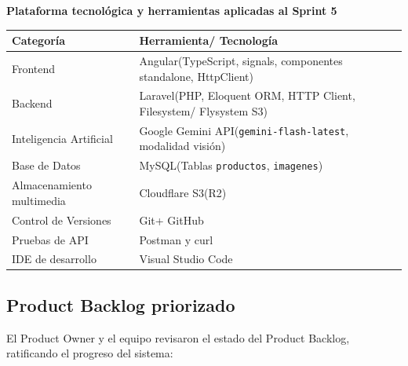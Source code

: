 \documentclass[12pt,a4paper]{article}
\begin{document}
\textbf{Plataforma tecnológica y herramientas aplicadas al Sprint 5}

\begin{center}
\small
\begin{tabularx}{\textwidth}{p{4.8cm} L}
\toprule
\textbf{Categoría} & \textbf{Herramienta/ Tecnología} \\
\midrule
Frontend & Angular(TypeScript, signals, componentes standalone, HttpClient) \\
Backend & Laravel(PHP, Eloquent ORM, HTTP Client, Filesystem/ Flysystem S3) \\
Inteligencia Artificial & Google Gemini API(\texttt{gemini-flash-latest}, modalidad visión) \\
Base de Datos & MySQL(Tablas \texttt{productos}, \texttt{imagenes}) \\
Almacenamiento multimedia & Cloudflare S3(R2) \\
Control de Versiones & Git+ GitHub \\
Pruebas de API & Postman y curl \\
IDE de desarrollo & Visual Studio Code \\
\bottomrule
\end{tabularx}
\end{center}

\subsection*{Product Backlog priorizado}

El Product Owner y el equipo revisaron el estado del Product Backlog, ratificando el progreso del sistema:
\end{document}
